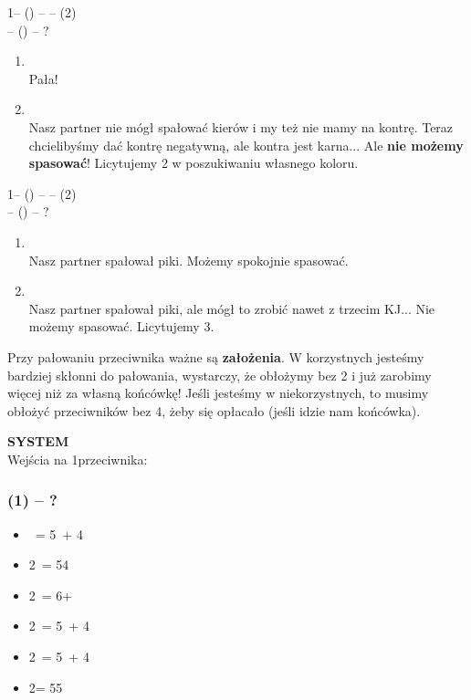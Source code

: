 \documentclass[12pt, a4paper]{article}
\begin{document}
1\nt -- (\alrts{2\clubs}) -- \dbl -- (2\hearts)\\
\pass -- (\pass) -- ?
\begin{enumerate}
    \item 
        \\
        Pała!
    \item 
        \\
        Nasz partner nie mógł spałować kierów i my też nie mamy na kontrę.
        Teraz chcielibyśmy dać kontrę negatywną, ale kontra jest karna...
        Ale \textbf{nie możemy spasować}! Licytujemy 2\nt
        w poszukiwaniu własnego koloru.
\end{enumerate}

1\nt -- (\alrts{2\clubs}) -- \dbl -- (2\spades)\\
\dbl -- (\pass) -- ?
\begin{enumerate}
    \item 
        \\
        Nasz partner spałował piki. Możemy spokojnie
        spasować.
    \item
        \\
        Nasz partner spałował piki, ale mógł to zrobić nawet z trzecim KJ...
        Nie możemy spasować. Licytujemy 3\nt.
\end{enumerate}

\begin{formal}
Przy pałowaniu przeciwnika ważne są \textbf{założenia}. 
W korzystnych jesteśmy bardziej skłonni do pałowania,
wystarczy, że obłożymy bez 2 i już zarobimy więcej niż za
własną końcówkę! Jeśli jesteśmy w niekorzystnych, to musimy
obłożyć przeciwników bez 4, żeby się opłacało (jeśli idzie nam końcówka).
\end{formal}

\newpage

\textbf{{\color{red}S}{\color{orange}Y}{\color{LimeGreen}S}{\color{cyan}T}{\color{blue}E}{\color{purple}M}}\\

Wejścia na 1\nt przeciwnika:

\subsubsection*{(1\ntx) -- ?}
\begin{itemize}
    \item \dbl\ = 5\minor\ + 4\major
    \item 2\clubs\ = 54 \major
    \item 2\diams\ = 6+ \major
    \item 2\hearts\ = 5\hearts\ + 4\minor
    \item 2\spades\ = 5\spades\ + 4\minor
    \item 2\nt = 55 \minor
\end{itemize}
\end{document}

